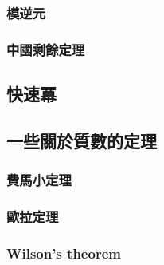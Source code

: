 \subsubsection{模逆元}

\subsubsection{中國剩餘定理}
\subsection{快速冪}

\subsection{一些關於質數的定理}
\subsubsection{費馬小定理}
\subsubsection{歐拉定理}
\subsubsection{Wilson's theorem}